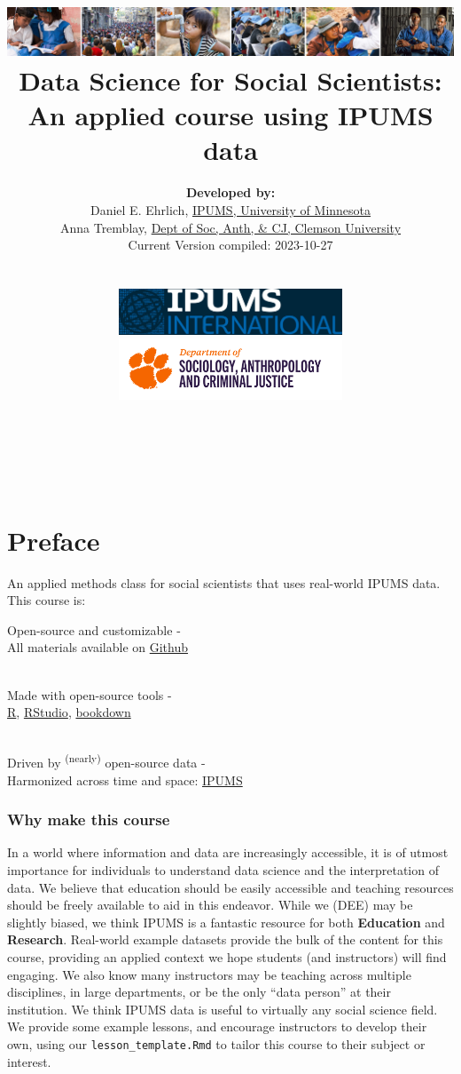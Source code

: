 \documentclass[
]{book}
\title{\includegraphics{ipums_banner.png}\\
Data Science for Social Scientists:\\
An applied course using IPUMS data }
\author{\textbf{Developed by:}\\
\hspace*{0.333em}\hspace*{0.333em}Daniel E. Ehrlich, \href{https://international.ipums.org/international/}{IPUMS, University of Minnesota}\\
\hspace*{0.333em}\hspace*{0.333em}Anna Tremblay, \href{https://www.clemson.edu/cbshs/departments/sacj/degrees/anthropology.html}{Dept of Soc, Anth, \& CJ, Clemson University}\\
\hspace*{0.333em}\hspace*{0.333em}Current Version compiled: 2023-10-27\\
\strut \\
\includegraphics[width=0.5\textwidth,height=\textheight]{ipums_i_logo.jpg}\\
\includegraphics[width=0.5\textwidth,height=\textheight]{clemson_logo.png}\\
\strut \\
\strut \\}
\date{}
\begin{document}
\maketitle

{
\setcounter{tocdepth}{1}
\tableofcontents
}
\hypertarget{preface}{%
\chapter*{Preface}\label{preface}}

An applied methods class for social scientists that uses real-world IPUMS data. This course is:

Open-source and customizable -\\
\hspace*{0.333em}\hspace*{0.333em}\hspace*{0.333em}All materials available on \href{https://github.com/ehrlichd/ipumsEDbook}{Github}\\
\strut \\
Made with open-source tools -\\
\hspace*{0.333em}\hspace*{0.333em}\href{https://cran.r-project.org/}{R}, \href{https://www.rstudio.com/products/rstudio/}{RStudio}, \href{https://bookdown.org/}{bookdown}\\
\strut \\
Driven by \textsuperscript{(nearly)} open-source data -\\
\hspace*{0.333em}\hspace*{0.333em}Harmonized across time and space: \href{https://ipums.org}{IPUMS}\\

\hypertarget{why-make-this-course}{%
\subsection*{Why make this course}\label{why-make-this-course}}

In a world where information and data are increasingly accessible, it is of utmost importance for individuals to understand data science and the interpretation of data. We believe that education should be easily accessible and teaching resources should be freely available to aid in this endeavor. While we (DEE) may be slightly biased, we think IPUMS is a fantastic resource for both \textbf{Education} and \textbf{Research}. Real-world example datasets provide the bulk of the content for this course, providing an applied context we hope students (and instructors) will find engaging. We also know many instructors may be teaching across multiple disciplines, in large departments, or be the only ``data person'' at their institution. We think IPUMS data is useful to virtually any social science field. We provide some example lessons, and encourage instructors to develop their own, using our \texttt{lesson\_template.Rmd} to tailor this course to their subject or interest.
\end{document}
